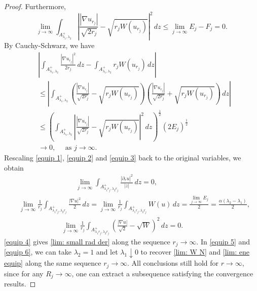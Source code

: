 \documentclass[leqno,11pt]{amsart}
\let\pa=\partial
\let\al=\alpha
\let\lam=\lambda
\let\f=\frac
\let\pa=\partial
\let\na=\nabla
\theoremstyle{remark}
\begin{document}
\begin{proof}
   Furthermore,
   \begin{equation}\label{equip 2}
 \lim_{j\to\infty} \int_{A_{\lambda_1,\lambda_2}^+}\left|\f{|\na u_{r_j}|}{\sqrt{2r_j}}- \sqrt{r_jW(u_{r_j})} \right|^2\,dz
       \leq   \lim_{j\to\infty} E_j-F_j=0. 
   \end{equation}
   By Cauchy-Schwarz, we have 
   \begin{equation}\label{equip 3}
       \begin{split}
           &\left|\int_{A_{\lambda_1,\lam_2}^+} \f{|\na u_{r_j}|^2}{2r_j}\,dz-  \int_{A_{\lam_1,\lam_2}^+} r_jW(u_{r_j})\,dz \right|\\
           &\leq \left| \int_{A_{\lambda_1,\lam_2}^+} \left( \f{|\na u_{r_j}|}{\sqrt{2r_j}}- \sqrt{r_jW(u_{r_j})}  \right)\left(\f{|\na u_{r_j}|}{\sqrt{2r_j}} +  \sqrt{r_jW(u_{r_j})}\right) \,dz\right|\\
           &\leq \left(\int_{A_{\lambda_1,\lambda_2}^+}\left|\f{|\na u_{r_j}|}{\sqrt{2r_j}}- \sqrt{r_jW(u_{r_j})} \right|^2\,dz\right)^{\f12} \left( 2E_j \right)^{\f12} \\
           &\longrightarrow0,\quad \text{ as }j\to\infty.
       \end{split}
   \end{equation}
   Rescaling \eqref{equip 1}, \eqref{equip 2} and \eqref{equip 3} back to the original variables, we obtain
   \begin{align}
    \label{equip 4}   &\qquad\qquad\qquad\qquad\lim_{j\to\infty} \int_{A_{\lam_1r_j,\lam_2r_j}^+} \f{|\pa_r u|^2}{|z|}\,dz=0,\\
     \label{equip 5}  &\lim_{j\to\infty} \f{1}{r_j} \int_{A_{\lam_1r_j,\lam_2r_j}^+} \f{|\na u|^2}{2}\,dz =\lim_{j\to\infty} \f{1}{r_j} \int_{A_{\lam_1r_j,\lam_2r_j}^+} W(u)\,dz=\f{\lim\limits_{j\to\infty }E_j}{2}=\f{\al(\lam_2-\lam_1)}{2}, \\
\label{equip 6}       &\qquad\qquad\qquad \lim_{j\to\infty} \f{1}{r_j} \int_{A_{\lam_1r_j,\lam_2r_j}^+} \left(\f{|\na u|}{\sqrt 2}-\sqrt{W}\right)^2\,dz=0.
   \end{align}
\eqref{equip 4} gives \eqref{lim: small rad der} along the sequence $r_j\to\infty$. In \eqref{equip 5} and \eqref{equip 6}, we can take $\lambda_2=1$ and let $\lambda_1\downarrow 0$ to recover \eqref{lim: W N} and \eqref{lim: ene equip} along the same sequence $r_j\to\infty$. All conclusions still hold for $r\to \infty$, since for any $R_j\to\infty$, one can extract a subsequence satisfying the convergence results.     
   
\end{proof}
\end{document}
